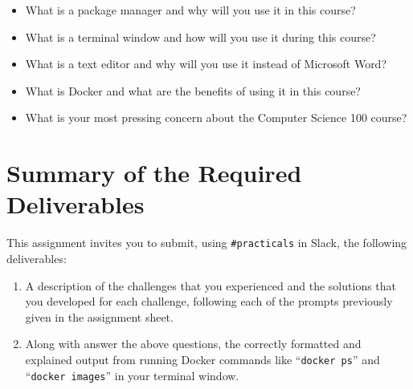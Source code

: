 \documentclass[11pt]{article}
\newcommand{\command}[1]{``\lstinline{#1}''}
\newcommand{\url}[1]{\lstinline{#1}}
\begin{document}
\vspace*{-.05in}

\begin{itemize}

\setlength{\itemsep}{0in}

  \item What is a package manager and why will you use it in this course?

  \item What is a terminal window and how will you use it during this course?

  \item What is a text editor and why will you use it instead of Microsoft Word?

  \item What is Docker and what are the benefits of using it in this course?

  \item What is your most pressing concern about the Computer Science 100 course?

\end{itemize}

\vspace*{-.1in}

\section*{Summary of the Required Deliverables}


\noindent This assignment invites you to submit, using \url{#practicals} in
Slack, the following deliverables:

\vspace*{-.025in}

\begin{enumerate}

  \setlength{\itemsep}{0in}

  \item A description of the challenges that you experienced and the solutions
    that you developed for each challenge, following each of the prompts
    previously given in the assignment sheet.

  \item Along with answer the above questions, the correctly formatted and
    explained output from running Docker commands like \command{docker ps} and
    \command{docker images} in your terminal window.

\end{enumerate}
\end{document}
